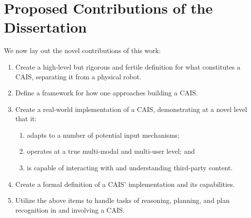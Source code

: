 \section{Proposed Contributions of the Dissertation}\label{sec:contributions}

We now lay out the novel contributions of this work:

\begin{enumerate}
\item Create a high-level but rigorous and fertile definition for what
  constitutes a CAIS, separating it from a physical robot.
\item Define a framework for how one approaches building a CAIS.
\item Create a real-world implementation of a CAIS, demonstrating at a
  novel level that it:
        \begin{enumerate}
            \item adapts to a number of potential input mechanisms;
            \item operates at a true multi-modal and multi-user level; and
            \item is capable of interacting with and understanding
              third-party content.
        \end{enumerate}
      \item Create a formal definition of a CAIS' implementation and
        its capabilities.
      \item Utilize the above items to handle tasks of reasoning,
        planning, and plan recognition in and involving a CAIS.
\end{enumerate}